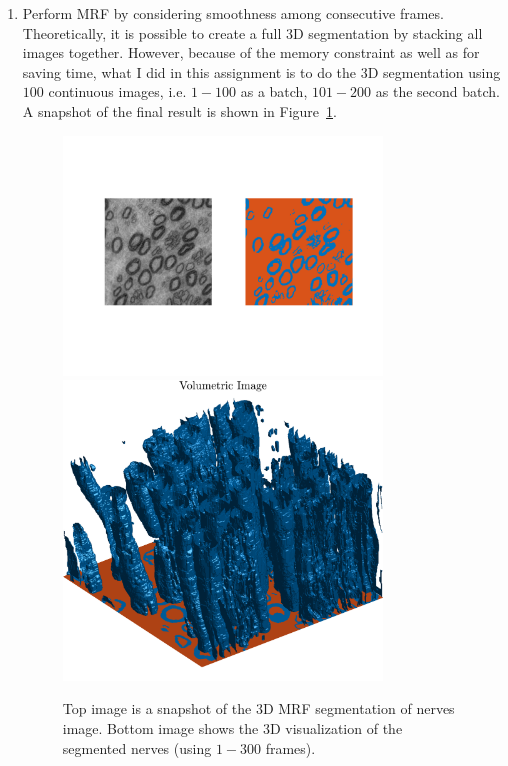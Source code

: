\documentclass[a4paper]{article}
\begin{document}
\begin{enumerate}
	\item Perform MRF by considering smoothness among consecutive frames. Theoretically, it is possible to create a full 3D segmentation by stacking all images together. However, because of the memory constraint as well as for saving time, what I did in this assignment is to do the 3D segmentation using $100$ continuous images, i.e. $1-100$ as a batch, $101-200$ as the second batch. A snapshot of the final result is shown in Figure~\ref{final2}.
	
	\begin{figure}[!b]
	\centering
	\includegraphics[width=0.8\textwidth]{./figures/2.png}
	\includegraphics[width=0.8\textwidth]{./figures/final_res2.png}
    \caption{Top image is a snapshot of the $3$D MRF segmentation of nerves image. Bottom image shows the 3D visualization of the segmented nerves (using $1-300$ frames).}
\label{final2}
\end{figure}    


\end{enumerate}
\end{document}
